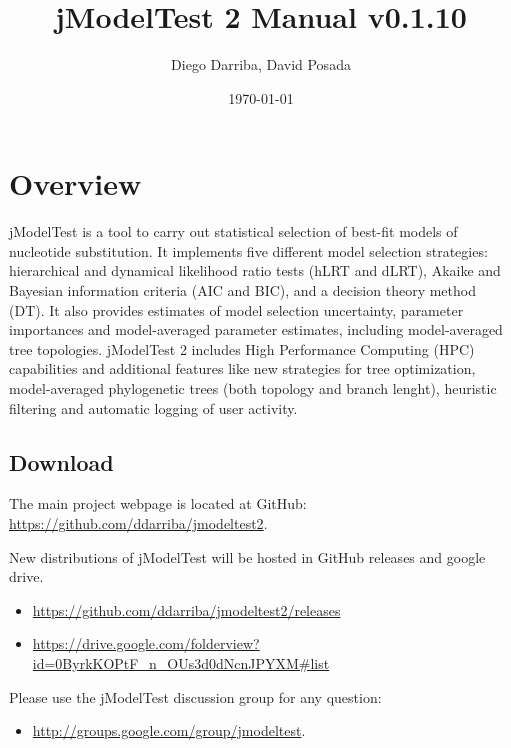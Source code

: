 \documentclass[10pt,twoside,a4paper]{article}
\begin{document}
\providecommand{\versionnumber}{0.1.10}
\title{jModelTest 2 Manual v\versionnumber}
\author{Diego Darriba, David Posada}
\date{\today}
\maketitle

\setcounter{tocdepth}{2}
\tableofcontents

\clearpage

\section{Overview}

jModelTest is a tool to carry out statistical selection of best-fit models of nucleotide substitution. It implements five different model selection strategies: hierarchical and dynamical likelihood ratio tests (hLRT and dLRT), Akaike and Bayesian information criteria (AIC and BIC), and a decision theory method (DT). It also provides estimates of model selection uncertainty, parameter importances and model-averaged parameter estimates, including model-averaged tree topologies. jModelTest 2 includes High Performance Computing (HPC) capabilities and additional features like new strategies for tree optimization, model-averaged phylogenetic trees (both topology and branch lenght), heuristic filtering and automatic logging of user activity.

\subsection{Download}

The main project webpage is located at GitHub: \url{https://github.com/ddarriba/jmodeltest2}.

New distributions of jModelTest will be hosted in GitHub releases and google drive.
\begin{itemize}
  \item \url{https://github.com/ddarriba/jmodeltest2/releases}
  \item \url{https://drive.google.com/folderview?id=0ByrkKOPtF_n_OUs3d0dNcnJPYXM#list}
\end{itemize}

Please use the jModelTest discussion group for any question: 
\begin{itemize}
  \item \url{http://groups.google.com/group/jmodeltest}.
\end{itemize}
\end{document}
